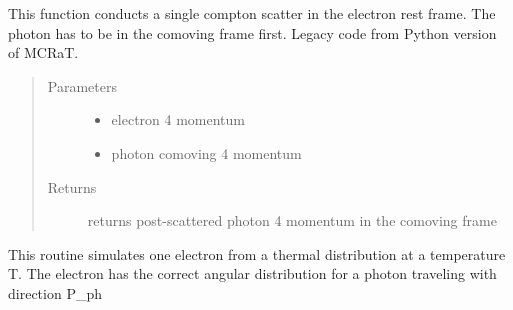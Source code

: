 \documentclass[letterpaper,10pt,english]{sphinxmanual}
\begin{document}

\begin{fulllineitems}
\label{\detokenize{mclib:mclib.single_cs}}
This function conducts a single compton scatter in the electron rest frame. The photon has to be in the comoving
frame first. Legacy code from Python version of MCRaT.
\begin{quote}\begin{description}
\item[{Parameters}] \leavevmode\begin{itemize}
\item {} 
 \textendash{} electron 4 momentum

\item {} 
 \textendash{} photon comoving 4 momentum

\end{itemize}

\item[{Returns}] \leavevmode
returns post-scattered photon 4 momentum in the comoving frame

\end{description}\end{quote}

\end{fulllineitems}


\begin{fulllineitems}
\label{\detokenize{mclib:mclib.single_electron}}
This routine simulates one electron from a thermal distribution at a
temperature T. The electron has the correct angular distribution for a
photon traveling with direction P\_ph

\end{fulllineitems}

\end{document}
